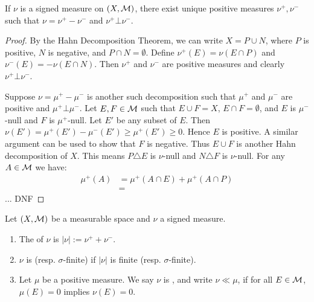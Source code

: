 \begin{theorem}\label{thm:jdt}
    If $\nu$ is a signed measure on $(X,\mathcal{M})$, there exist unique positive measures $\nu^+,\nu^-$ such that $\nu = \nu^+ - \nu^-$ and $\nu^+ \bot \nu^-$.
\end{theorem}
    \begin{proof}
        By the Hahn Decomposition Theorem, we can write $X = P \cup N$, where $P$ is positive, $N$ is negative, and $P \cap N = \emptyset$. Define $\nu^+(E) = \nu(E \cap P)$ and $\nu^-(E) = -\nu(E \cap N)$. Then $\nu^+$ and $\nu^-$ are positive measures and clearly $\nu^+ \bot \nu^-$.

        Suppose $\nu = \mu^+ - \mu^-$ is another such decomposition such that $\mu^+$ and $\mu^-$ are positive and $\mu^+ \bot \mu^-$. Let $E,F \in \mathcal{M}$ such that $E \cup F = X$, $E \cap F = \emptyset$, and $E$ is $\mu^-$-null and $F$ is $\mu^+$-null. Let $E'$ be any subset of $E$. Then $\nu(E') = \mu^+(E') - \mu^-(E') \geq \mu^+(E') \geq 0$. Hence $E$ is positive. A similar argument can be used to show that $F$ is negative. Thus $E \cup F$ is another Hahn decomposition of $X$. This means $P \triangle E$ is $\nu$-null and $N \triangle F$ is $\nu$-null. For any $A \in \mathcal{M}$ we have:
            \begin{equation*}
            \begin{split}
                \mu^+(A)
                & = \mu^+(A \cap E) + \mu^+(A \cap P) \\
                & = 
            \end{split}
            \end{equation*}
        {\color{red} ... DNF}
    \end{proof}

\begin{definition}
Let $(X,\mathcal{M})$ be a measurable space and $\nu$ a signed measure.
\begin{enumerate}[label = (\arabic*),itemsep=1pt,topsep=3pt]
    \item The  of $\nu$ is $|\nu| := \nu^+ + \nu^-$.
    \item $\nu$ is  (resp. $\sigma$-finite) if $|\nu|$ is finite (resp. $\sigma$-finite).
    \item Let $\mu$ be a positive measure. We say $\nu$ is , and write $\nu \ll \mu$, if for all $E \in \mathcal{M}$, $\mu(E) = 0$ implies $\nu(E) = 0$.
\end{enumerate}
\end{definition}

